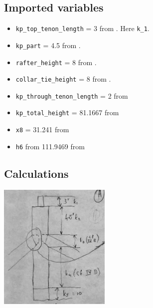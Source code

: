 \documentclass{article}\usepackage[]{graphicx}\usepackage[]{xcolor}
\begin{document}
\subsection{Imported variables} \label{kp-rafter-joints-imported-variables}
\begin{itemize}
  \item \verb+kp_top_tenon_length+ = 3 from . Here \verb+k_1+.
  \item \verb+kp_part+ = 4.5 from .
  \item \verb+rafter_height+ = 8 from . 
  \item \verb+collar_tie_height+ = 8 from .
  \item \verb+kp_through_tenon_length+ = 2 from 
  \item \verb+kp_total_height+ = 81.1667 from 
  \item \verb+x8+ = 31.241 from 
  \item \verb+h6+ from 111.9469 from 
\end{itemize}



\subsection{Calculations} \label{kp-rafter-joints-calculations}

\begin{center}
\end{center}

\begin{center}
	\includegraphics[width=0.4\textwidth]{images/kingpost_overall}
\end{center}
\end{document}
